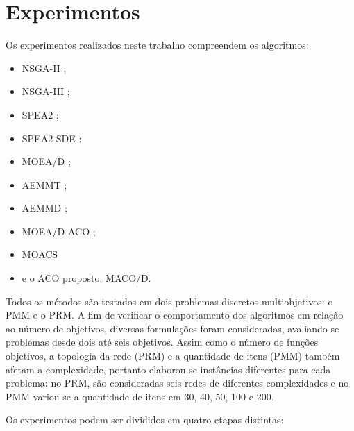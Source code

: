 \chapter[Experimentos]{Experimentos}
\label{chapter_experimentos}

Os experimentos realizados neste trabalho compreendem os algoritmos:

\acresetall
\begin{itemize}
	\item \ac{NSGA-II} \cite{Deb2002};
	\item \ac{NSGA-III} \cite{Deb2014};
	\item \ac{SPEA2} \cite{Zitzler2002};
	\item \ac{SPEA2-SDE} \cite{Spea2SDE};
	\item \ac{MOEA/D} \cite{Zhang2007};
	\item \ac{AEMMT} \cite{Brasil2013};
	\item \ac{AEMMD} \cite{Lafeta2016};
	\item \ac{MOEA/D-ACO} \cite{Ke2013};
	\item \ac{MOACS} \cite{Riveros2016}
	\item e o ACO proposto: \ac{MACO/D}.
\end{itemize}

Todos os métodos são testados em dois problemas discretos multiobjetivos: o PMM e o PRM. A fim  de verificar o comportamento dos algoritmos em relação ao número de objetivos, diversas formulações foram consideradas, avaliando-se problemas desde dois até seis objetivos. Assim como o número de funções objetivos, a topologia da rede (PRM) e a quantidade de itens (PMM) também afetam a complexidade, portanto elaborou-se instâncias diferentes para cada problema: no PRM, são consideradas seis redes de diferentes complexidades e no PMM variou-se a quantidade de itens em 30, 40, 50, 100 e 200.

Os experimentos podem ser divididos em quatro etapas distintas:

